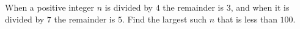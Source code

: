 When a positive integer $n$ is divided by $4$ the remainder is $3$, and when it is divided by $7$ the remainder is $5$. Find the largest such $n$ that is less than $100$.

